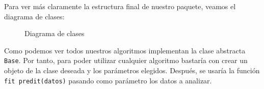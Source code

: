 Para ver más claramente la estructura final de nuestro paquete, veamos
el diagrama de clases:
\begin{figure}[H]
    \caption{\label{fig:esquema} Diagrama de clases}
\end{figure}

Como podemos ver todos nuestros algoritmos implementan la clase abstracta
\texttt{Base}. Por tanto, para poder utilizar cualquier algoritmo bastaría
con crear un objeto de la clase deseada y los parámetros elegidos. Después,
se usaría la función \texttt{fit predit(datos)} pasando como parámetro 
los datos a analizar.

